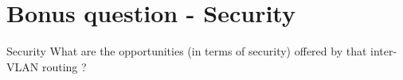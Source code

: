 \section{Bonus question - Security}

\begin{bonusQuestionBox}{Security}
    What are the opportunities (in terms of security) offered by that inter-VLAN routing ?
\end{bonusQuestionBox}
